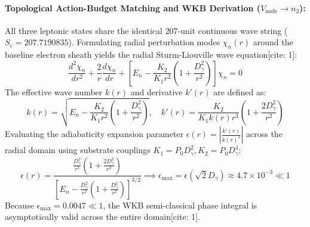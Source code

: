 \documentclass[11pt,a4paper]{article}
\begin{document}
	\paragraph{Topological Action-Budget Matching and WKB Derivation ($V_{\text{node}} \to n_2$):}
	All three leptonic states share the identical $207$-unit continuous wave string ($S_e = 207.7190835$). Formulating radial perturbation modes $\chi_n(r)$ around the baseline electron sheath yields the radial Sturm-Liouville wave equation[cite: 1]:
	\begin{equation}
		\frac{d^2 \chi_n}{dr^2} + \frac{2}{r} \frac{d\chi_n}{dr} + \left[ E_n - \frac{K_2}{K_1 r^2} \left(1 + \frac{D_\gamma^2}{r^2}\right) \right] \chi_n = 0
	\end{equation}
	The effective wave number $k(r)$ and derivative $k'(r)$ are defined as:
	\begin{equation}
		k(r) = \sqrt{E_n - \frac{K_2}{K_1 r^2}\left(1 + \frac{D_\gamma^2}{r^2}\right)}, \quad k'(r) = \frac{K_2}{K_1 k(r) r^3} \left(1 + \frac{2 D_\gamma^2}{r^2}\right)
	\end{equation}
	Evaluating the adiabaticity expansion parameter $\epsilon(r) = \left|\frac{k'(r)}{k(r)^2}\right|$ across the radial domain using substrate couplings $K_1 = P_0 D_\gamma^2, K_2 = P_0 D_\gamma^4$:
	\begin{equation}
		\epsilon(r) = \frac{\frac{D_\gamma^2}{r^3} \left(1 + \frac{2 D_\gamma^2}{r^2}\right)}{\left[ E_n - \frac{D_\gamma^2}{r^2}\left(1 + \frac{D_\gamma^2}{r^2}\right) \right]^{3/2}} \implies \epsilon_{\text{max}} = \epsilon(\sqrt{2}D_\gamma) \approx 4.7 \times 10^{-3} \ll 1
	\end{equation}
	Because $\epsilon_{\text{max}} = 0.0047 \ll 1$, the WKB semi-classical phase integral is asymptotically valid across the entire domain[cite: 1].
	
\end{document}
